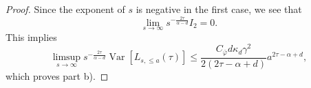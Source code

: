 \documentclass{article}
\theoremstyle{definition}
\numberwithin{equation}{section}
\theoremstyle{remark}
\begin{document}
\begin{proof}
Since the exponent of $s$ is negative in the first case, we see that
$$
\lim_{s\to\infty} s^{-\frac{2\tau}{\alpha-d}}I_2 = 0.
$$
This implies
$$
\limsup_{s\to\infty} s^{-\frac{2\tau}{\alpha-d}} \operatorname{Var}[L_{s,\leq a}(\tau)] \leq \frac{C_{\bar{\varphi}}d\kappa_d\gamma^2 }{2(2\tau-\alpha+d)} a^{2\tau-\alpha+d},
$$
which proves part b).
\end{proof}
\end{document}
